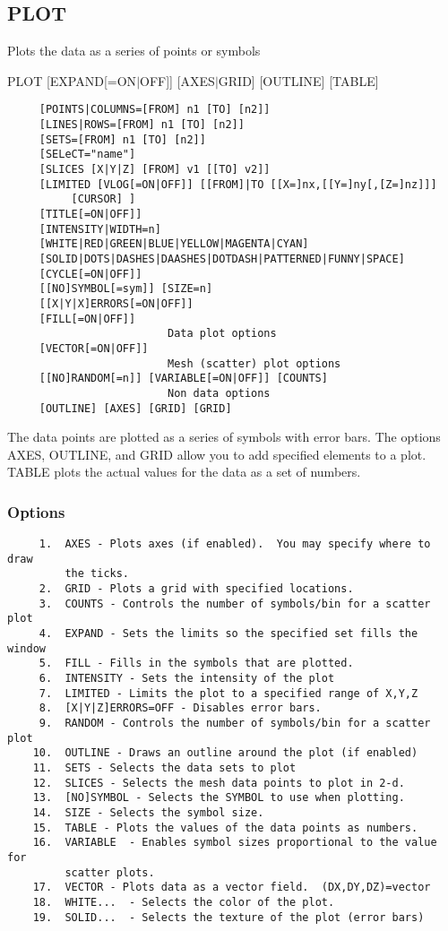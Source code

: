 \subsection{PLOT}
Plots the data as a series of points or symbols 

PLOT [EXPAND[=ON$|$OFF]] [AXES$|$GRID] [OUTLINE] [TABLE] 
\begin{verbatim}
     [POINTS|COLUMNS=[FROM] n1 [TO] [n2]] 
     [LINES|ROWS=[FROM] n1 [TO] [n2]] 
     [SETS=[FROM] n1 [TO] [n2]] 
     [SELeCT="name"] 
     [SLICES [X|Y|Z] [FROM] v1 [[TO] v2]] 
     [LIMITED [VLOG[=ON|OFF]] [[FROM]|TO [[X=]nx,[[Y=]ny[,[Z=]nz]]]
          [CURSOR] ] 
     [TITLE[=ON|OFF]] 
     [INTENSITY|WIDTH=n] 
     [WHITE|RED|GREEN|BLUE|YELLOW|MAGENTA|CYAN] 
     [SOLID|DOTS|DASHES|DAASHES|DOTDASH|PATTERNED|FUNNY|SPACE] 
     [CYCLE[=ON|OFF]] 
     [[NO]SYMBOL[=sym]] [SIZE=n] 
     [[X|Y|X]ERRORS[=ON|OFF]] 
     [FILL[=ON|OFF]] 
                         Data plot options 
     [VECTOR[=ON|OFF]] 
                         Mesh (scatter) plot options 
     [[NO]RANDOM[=n]] [VARIABLE[=ON|OFF]] [COUNTS] 
                         Non data options 
     [OUTLINE] [AXES] [GRID] [GRID] 
\end{verbatim}

The  data points are plotted as a series of symbols with error bars.  The
options AXES, OUTLINE, and GRID allow you to add specified elements to  a
plot.  TABLE plots the actual values for the data as a set of numbers.  
\subsubsection{Options}
\begin{verbatim}
     1.  AXES - Plots axes (if enabled).  You may specify where to draw
         the ticks.  
     2.  GRID - Plots a grid with specified locations.  
     3.  COUNTS - Controls the number of symbols/bin for a scatter plot 
     4.  EXPAND - Sets the limits so the specified set fills the window 
     5.  FILL - Fills in the symbols that are plotted.  
     6.  INTENSITY - Sets the intensity of the plot 
     7.  LIMITED - Limits the plot to a specified range of X,Y,Z 
     8.  [X|Y|Z]ERRORS=OFF - Disables error bars.  
     9.  RANDOM - Controls the number of symbols/bin for a scatter plot 
    10.  OUTLINE - Draws an outline around the plot (if enabled) 
    11.  SETS - Selects the data sets to plot 
    12.  SLICES - Selects the mesh data points to plot in 2-d.  
    13.  [NO]SYMBOL - Selects the SYMBOL to use when plotting.  
    14.  SIZE - Selects the symbol size.  
    15.  TABLE - Plots the values of the data points as numbers.  
    16.  VARIABLE  - Enables symbol sizes proportional to the value for
         scatter plots.  
    17.  VECTOR - Plots data as a vector field.  (DX,DY,DZ)=vector 
    18.  WHITE...  - Selects the color of the plot.  
    19.  SOLID...  - Selects the texture of the plot (error bars) 
\end{verbatim}
